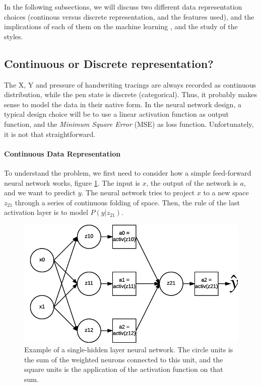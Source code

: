   \par In the following subsections, we will discuss two different data representation choices (continous versus discrete representation, and the features used), and the implications of each of them on the machine learning , and the study of the styles.

  \subsection{Continuous or Discrete representation?}

    \par The X, Y and pressure of handwriting tracings are always recorded as continuous distribution, while the pen state is discrete (categorical). Thus, it probably makes sense to model the data in their native form. In the neural network design, a typical design choice will be to use a linear activation function as output function, and the \textit{Minimum Square Error} (MSE) as loss function. Unfortunately, it is not that straightforward.

    \paragraph{Continuous Data Representation}
      \par To understand the problem, we first need to consider how a simple feed-forward neural network works, figure \ref{fig:mlp_simple}. The input is $x$, the output of the network is $a$, and we want to predict $y$. The neural network tries to project $x$ to a new space $z_{21}$ through a series of continuous folding of space. Then, the rule of the last activation layer is to model $P(y|z_{21})$.

      \begin{figure}[!htbp]
          \centering
          \includegraphics[scale=0.8]{images/sota/Multi-layer-perceptron2.png}
          \caption{Example of a single-hidden layer neural network. The circle units is the sum of the weighted neurons connected to this unit, and the square units is the application of the activation function on that sum.}%
          \label{fig:mlp_simple}
      \end{figure}

